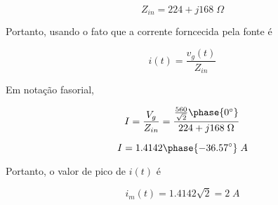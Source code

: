 \[ Z_{in} = 224 + j168 \; \Omega \]

Portanto, usando o fato que a corrente forncecida pela fonte é

\[ i(t) = \frac{v_g(t)}{Z_{in}} \]

Em notação fasorial,

\[ I = \frac{V_g}{Z_{in}} = \frac{\frac{560}{\sqrt{2}}\phase{0^{\circ}}}{224 + j168 \; \Omega} \]

\[ I = 1.4142\phase{-36.57^{\circ}} \; A \]

Portanto, o valor de pico de \(i(t)\) é

\[ \boxed{i_m(t) = 1.4142 \sqrt{2} = 2 \; A}  \]


% 